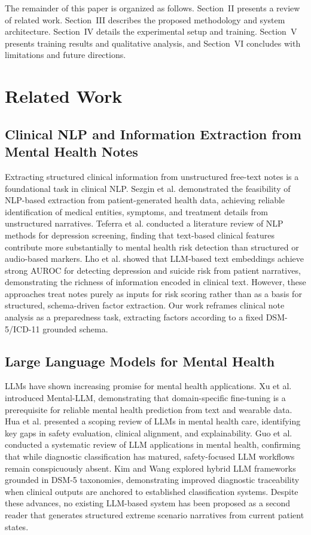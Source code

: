 \documentclass[conference]{IEEEtran}
\begin{document}
The remainder of this paper is organized as follows. Section~II presents a review of related work. Section~III describes the proposed methodology and system architecture. Section~IV details the experimental setup and training. Section~V presents training results and qualitative analysis, and Section~VI concludes with limitations and future directions.

\section{Related Work}

\subsection{Clinical NLP and Information Extraction from Mental Health Notes}

Extracting structured clinical information from unstructured free-text notes is a foundational task in clinical NLP. Sezgin et al. \cite{b3} demonstrated the feasibility of NLP-based extraction from patient-generated health data, achieving reliable identification of medical entities, symptoms, and treatment details from unstructured narratives. Teferra et al. \cite{b15} conducted a literature review of NLP methods for depression screening, finding that text-based clinical features contribute more substantially to mental health risk detection than structured or audio-based markers. Lho et al. \cite{b16} showed that LLM-based text embeddings achieve strong AUROC for detecting depression and suicide risk from patient narratives, demonstrating the richness of information encoded in clinical text. However, these approaches treat notes purely as inputs for risk scoring rather than as a basis for structured, schema-driven factor extraction. Our work reframes clinical note analysis as a preparedness task, extracting factors according to a fixed DSM-5/ICD-11 grounded schema.

\subsection{Large Language Models for Mental Health}

LLMs have shown increasing promise for mental health applications. Xu et al. \cite{b4} introduced Mental-LLM, demonstrating that domain-specific fine-tuning is a prerequisite for reliable mental health prediction from text and wearable data. Hua et al. \cite{b6} presented a scoping review of LLMs in mental health care, identifying key gaps in safety evaluation, clinical alignment, and explainability. Guo et al. \cite{b5} conducted a systematic review of LLM applications in mental health, confirming that while diagnostic classification has matured, safety-focused LLM workflows remain conspicuously absent. Kim and Wang \cite{b17} explored hybrid LLM frameworks grounded in DSM-5 taxonomies, demonstrating improved diagnostic traceability when clinical outputs are anchored to established classification systems. Despite these advances, no existing LLM-based system has been proposed as a second reader that generates structured extreme scenario narratives from current patient states.
\end{document}
